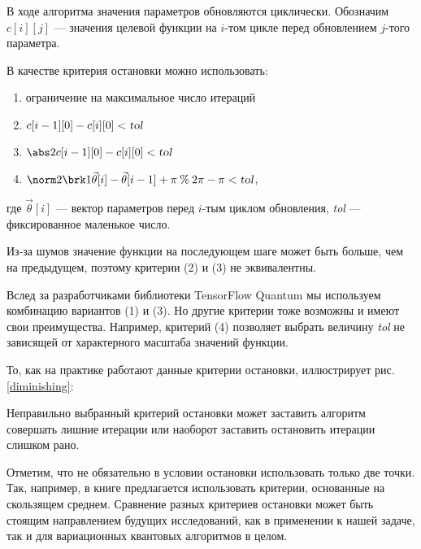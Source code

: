 В ходе алгоритма значения параметров обновляются циклически. Обозначим $c[i][j]$ --- значения целевой функции на $i$-том цикле перед обновлением $j$-того параметра.%

В качестве критерия остановки можно использовать:

\begin{enumerate}
    \item ограничение на максимальное число итераций
    \item $c[i-1][0] - c[i][0] < \textsl{tol}$
    \item $\abs2{c[i-1][0] - c[i][0]} < \textsl{tol}$
    \item $\norm2{\brk1{\vec \theta[i] - \vec \theta[i-1] + \pi} \mathbin{\%} 2\pi - \pi} < \textsl{tol}$,
\end{enumerate}

где $\vec \theta [i]$ --- вектор параметров перед $i$-тым циклом обновления, \textsl{tol} --- фиксированное маленькое число. 

Из-за шумов значение функции на последующем шаге может быть больше, чем на предыдущем, поэтому критерии (2) и (3) не эквивалентны.

Вслед за разработчиками библиотеки TensorFlow Quantum \cite{tfq} мы используем комбинацию вариантов (1) и (3). Но другие критерии тоже возможны и имеют свои преимущества. Например, критерий (4) позволяет выбрать величину \textsl{tol} не зависящей от характерного масштаба значений функции. 

То, как на практике работают данные критерии остановки, иллюстрирует рис. \ref{diminishing}:



Неправильно выбранный критерий остановки может заставить алгоритм совершать лишние итерации или наоборот заставить остановить итерации слишком рано.

Отметим, что не обязательно в условии остановки использовать только две точки. Так, например, в книге \cite{cross-entropy} предлагается использовать критерии, основанные на скользящем среднем. Сравнение разных критериев остановки может быть стоящим направлением будущих исследований, как в применении к нашей задаче, так и для вариационных квантовых алгоритмов в целом.


